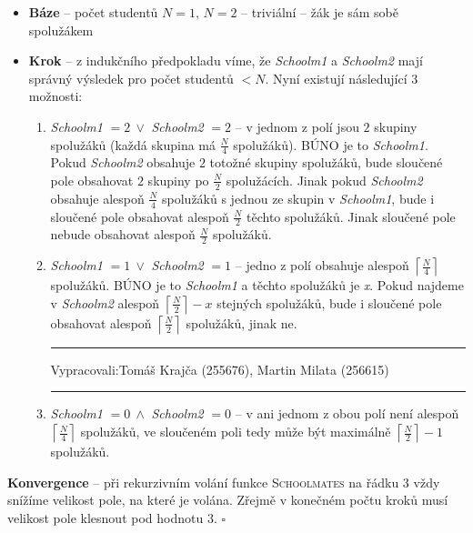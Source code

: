 \documentclass[12pt]{article}
\newcommand{\var}[1]{\textit{#1}}
\newcommand{\zadani}[2]{
{\large
\noindent {\bf IB108 \hfill{} Sada #1, Příklad #2 \\[-4mm]}
\noindent\hrule
\vspace{2mm}
\noindent Vypracovali:\hfill{}Tomáš Krajča (255676), Martin Milata (256615)
\vspace{3mm}
\hrule
\bigskip\bigskip}
}
\begin{document}
\renewcommand{\labelenumi}{\textbf{\alph{enumi})}}
\begin{itemize}
\item \textbf{Báze} -- počet studentů $N=1$, $N=2$ -- triviální -- žák je sám sobě spolužákem
\item \textbf{Krok} -- z indukčního předpokladu víme, že \var{Schoolm1} a
\var{Schoolm2} mají správný výsledek pro počet studentů $ < N$. Nyní existují
následující $3$ možnosti:\begin{enumerate}
\item \var{Schoolm1} $ = 2~\vee $ \var{Schoolm2} $ = 2$ -- v jednom z polí jsou
$2$ skupiny spolužáků (každá skupina má $\frac{N}{4}$ spolužáků). BÚNO je to
\var{Schoolm1}. Pokud \var{Schoolm2} obsahuje $2$ totožné skupiny spolužáků,
bude sloučené pole obsahovat $2$ skupiny po $\frac{N}{2}$ spolužácích. Jinak pokud
\var{Schoolm2} obsahuje alespoň $\frac{N}{4}$ spolužáků s jednou ze skupin v
\var{Schoolm1}, bude i sloučené pole obsahovat alespoň $\frac{N}{2}$ těchto
spolužáků. Jinak sloučené pole nebude obsahovat alespoň $\frac{N}{2}$ spolužáků.
\item \var{Schoolm1} $ = 1~\vee $ \var{Schoolm2} $ = 1$ -- jedno z polí obsahuje
alespoň $\left\lceil\frac{N}{4}\right\rceil$ spolužáků. BÚNO je to
\var{Schoolm1} a těchto spolužáků je \var{x}. Pokud najdeme v \var{Schoolm2}
alespoň $\left\lceil\frac{N}{2}\right\rceil-x$ stejných spolužáků, bude i sloučené pole obsahovat alespoň
$\left\lceil\frac{N}{2}\right\rceil$ spolužáků, jinak ne.

\clearpage
\zadani{1}{1}
\item \var{Schoolm1} $ = 0~\wedge $ \var{Schoolm2} $ = 0$ -- v ani jednom z obou
 polí není alespoň $\left\lceil\frac{N}{4}\right\rceil$ spolužáků, ve sloučeném
 poli tedy může být maximálně $\left\lceil\frac{N}{2}\right\rceil-1$ spolužáků.
\end{enumerate}
\end{itemize}
\textbf{Konvergence} -- při rekurzivním volání funkce \textsc{Schoolmates} na
řádku $3$ vždy
snížíme velikost pole, na které je volána. Zřejmě v konečném počtu kroků musí
velikost pole klesnout pod hodnotu $3$. 
\hfill$\square$
\end{document}
